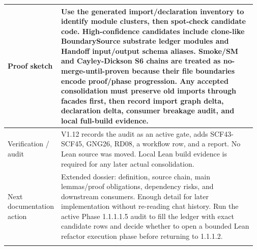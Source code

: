 \begin{longtable}{L{0.16\linewidth} L{0.81\linewidth}}
\hline\addlinespace[0.20em]
Proof sketch & Use the generated import/\allowbreak{}declaration inventory to identify module clusters, then spot-check candidate code. High-confidence candidates include clone-like BoundarySource substrate ledger modules and Handoff input/\allowbreak{}output schema aliases. Smoke/\allowbreak{}SM and Cayley-Dickson S6 chains are treated as no-merge-until-proven because their file boundaries encode proof/\allowbreak{}phase progression. Any accepted consolidation must preserve old imports through facades first, then record import graph delta, declaration delta, consumer breakage audit, and local full-build evidence.\\
\hline\addlinespace[0.20em]
Verification /\allowbreak{} audit & V1.12 records the audit as an active gate, adds SCF43-SCF45, GNG26, RD08, a workflow row, and a report. No Lean source was moved. Local Lean build evidence is required for any later actual consolidation.\\
\hline\addlinespace[0.20em]
Next documentation action & Extended dossier: definition, source chain, main lemmas/\allowbreak{}proof obligations, dependency risks, and downstream consumers. Enough detail for later implementation without re-reading chat history. Run the active Phase 1.1.1.1.5 audit to fill the ledger with exact candidate rows and decide whether to open a bounded Lean refactor execution phase before returning to 1.1.1.2.\\
\hline\addlinespace[0.20em]
\end{longtable}
